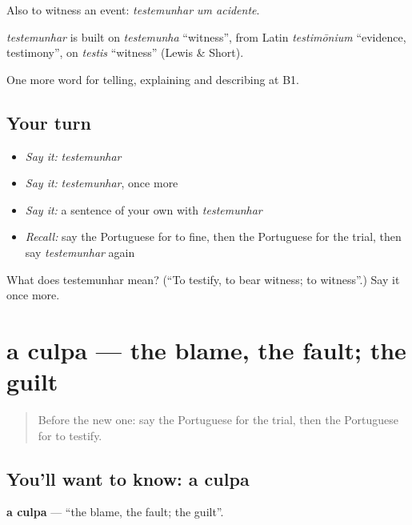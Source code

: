 Also to witness an event: \emph{testemunhar um acidente}.

\begin{cousinweb}
\emph{testemunhar} is built on \emph{testemunha} \textquotedblleft{}witness\textquotedblright{}, from Latin \emph{testimōnium} \textquotedblleft{}evidence, testimony\textquotedblright{}, on \emph{testis} \textquotedblleft{}witness\textquotedblright{} (Lewis \& Short).
\end{cousinweb}

\begin{grammarlens}[title={What you've built}]
One more word for telling, explaining and describing at B1.
\end{grammarlens}

\subsection*{Your turn}
\begin{itemize}
\raggedright
  \item \emph{Say it:} \emph{testemunhar}
  \item \emph{Say it:} \emph{testemunhar}, once more
  \item \emph{Say it:} a sentence of your own with \emph{testemunhar}
  \item \emph{Recall:} say the Portuguese for to fine, then the Portuguese for the trial, then say \emph{testemunhar} again
\end{itemize}

\begin{tcolorbox}[breakable,colback=teal!4,colframe=teal!35!black,title={Before you move on}]
What does testemunhar mean? (\textquotedblleft{}To testify, to bear witness; to witness\textquotedblright{}.) Say it once more.
\end{tcolorbox}
\section[a culpa]{a culpa — the blame, the fault; the guilt}

\label{lesson:PT-C390-culpa}



\begin{quote}
Before the new one: say the Portuguese for the trial, then the Portuguese for to testify.
\end{quote}

\subsection*{You'll want to know: a culpa}
\textbf{a culpa} — \textquotedblleft{}the blame, the fault; the guilt\textquotedblright{}.

